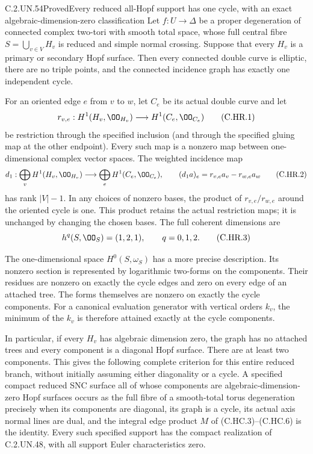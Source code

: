 \begin{statement}{C.2.UN.54}{Proved}{Every reduced all-Hopf support has one cycle, with an exact algebraic-dimension-zero classification}
Let $f:U\to\Delta$ be a proper degeneration of connected complex
two-tori with smooth total space, whose full central fibre
$S=\bigcup_{v\in V}H_v$ is reduced and simple normal crossing.
Suppose that every $H_v$ is a primary or secondary Hopf surface.
Then every connected double curve is elliptic, there are no triple
points, and the connected incidence graph has exactly one independent
cycle.

For an oriented edge $e$ from $v$ to $w$, let $C_e$ be its actual
double curve and let
\[
 r_{v,e}:H^1(H_v,\OO_{H_v})\longrightarrow H^1(C_e,\OO_{C_e})
                                                        \tag{C.HR.1}
\]
be restriction through the specified inclusion (and through the
specified gluing map at the other endpoint). Every such map is a
nonzero map between one-dimensional complex vector spaces. The
weighted incidence map
\[
 d_1:\bigoplus_vH^1(H_v,\OO_{H_v})
       \longrightarrow\bigoplus_eH^1(C_e,\OO_{C_e}),\qquad
 (d_1a)_e=r_{v,e}a_v-r_{w,e}a_w
                                                        \tag{C.HR.2}
\]
has rank $|V|-1$. In any choices of nonzero bases, the product of
$r_{v,e}/r_{w,e}$ around the oriented cycle is one. This product
retains the actual restriction maps; it is unchanged by changing
the chosen bases. The full coherent dimensions are
\[
                    h^q(S,\OO_S)=(1,2,1),\qquad q=0,1,2.
                                                        \tag{C.HR.3}
\]

The one-dimensional space $H^0(S,\omega_S)$ has a more precise
description. Its nonzero section is represented by logarithmic
two-forms on the components. Their residues are nonzero on exactly
the cycle edges and zero on every edge of an attached tree. The
forms themselves are nonzero on exactly the cycle components.
For a canonical evaluation generator with vertical orders $k_v$,
the minimum of the $k_v$ is therefore attained exactly at the
cycle components.

In particular, if every $H_v$ has algebraic dimension zero, the
graph has no attached trees and every component is a diagonal Hopf
surface. There are at least two components. This gives the following
complete criterion for this entire reduced branch, without initially
assuming either diagonality or a cycle. A specified compact reduced
SNC surface all of whose components are algebraic-dimension-zero
Hopf surfaces occurs as the full fibre of a smooth-total torus
degeneration precisely when its components are diagonal, its graph
is a cycle, its actual axis normal lines are dual, and the integral
edge product $M$ of (C.HC.3)--(C.HC.6) is the identity. Every such
specified support has the compact realization of C.2.UN.48, with
all support Euler characteristics zero.
\end{statement}


